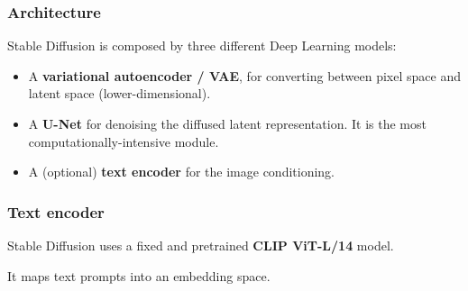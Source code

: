 \begin{frame}
    \frametitle{Architecture}
    Stable Diffusion is composed by three different Deep Learning models:
    \begin{itemize}
        \item A \textbf{variational autoencoder / VAE}, for converting between pixel space and latent space (lower-dimensional).
        \item A \textbf{U-Net} for denoising the diffused latent representation. It is the most computationally-intensive module.
        \item A (optional) \textbf{text encoder} for the image conditioning.
    \end{itemize}
\end{frame}

\begin{frame}
    \frametitle{Text encoder}
    Stable Diffusion uses a fixed and pretrained \textbf{CLIP ViT-L/14} model.

    It maps text prompts into an embedding space.
\end{frame}